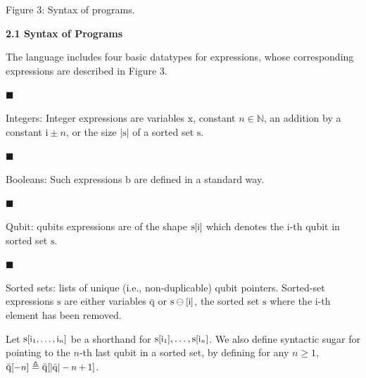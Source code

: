 Figure 3: Syntax of programs.\par
 
 
 
\par\medskip\noindent\textbf{2.1 Syntax of Programs}\par
 
 
The language includes four basic datatypes for expressions, whose corresponding expressions are described in Figure 3.\par
  
\par\noindent  $\blacksquare$ 
 
Integers: Integer expressions are variables $\mathrm{x}$, constant $n\in\mathbb{N}$, an addition by a constant $\mathrm{i}\pm n$, or the size $|\mathrm{s}|$ of a sorted set $\mathrm{s}$.\par
 
 
 
\par\noindent  $\blacksquare$ 
 
Booleans: Such expressions $\mathrm{b}$ are defined in a standard way.\par
 
 
 
\par\noindent  $\blacksquare$ 
 
Qubit: qubits expressions are of the shape $\mathrm{s}\textnormal{\small[$\mathrm{i}$]}$ which denotes the $\mathrm{i}$-th qubit in sorted set $\mathrm{s}$.\par
 
 
 
\par\noindent  $\blacksquare$ 
 
Sorted sets: lists of unique (i.e., non-duplicable) qubit pointers. Sorted-set expressions $\mathrm{s}$ are either variables $\bar{\mathrm{q}}$ or $\mathrm{s}\ominus\textnormal{\small[$\mathrm{i}$]}$, the sorted set $\mathrm{s}$ where the $\mathrm{i}$-th element has been removed.\par
 
 
  
Let $\mathrm{s}\textnormal{\small[$\mathrm{i}_{1},\ldots,\mathrm{i}_{n}$]}$ be a shorthand for $\mathrm{s}\textnormal{\small[$\mathrm{i}_{1}$]},\ldots,\mathrm{s}\textnormal{%
\small[$\mathrm{i}_{n}$]}$. We also define syntactic sugar for pointing to the $n$-th last qubit in a sorted set, by defining for any $n\geq 1$, $\bar{\mathrm{q}}\textnormal{\small[$-n$]}\triangleq\bar{\mathrm{q}}\textnormal%
{\small[$|\bar{\mathrm{q}}|-n+1$]}$.\par
 

